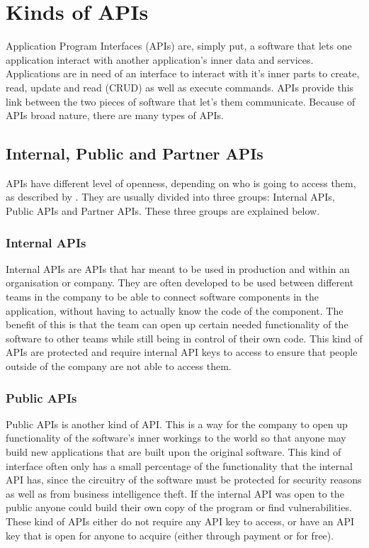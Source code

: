 \documentclass{cslthse-msc}
\begin{document}
    \section{Kinds of APIs}

    Application Program Interfaces (APIs) are, simply put, a software that
    lets one application interact with another application's inner data and
    services. Applications are in need of an interface to interact with it's
    inner parts to create, read, update and read (CRUD) as well as execute
    commands. APIs provide this link between the two pieces of software that let's
    them communicate. Because of APIs broad nature, there are many types of
    APIs\citep{rest2}.

    \subsection{Internal, Public and Partner APIs}
    APIs have different level of openness, depending on who is going to access them, as described by \cite{levin}. They are
    usually divided into three groups: Internal APIs, Public APIs and Partner APIs. These
    three groups are explained below.
    \subsubsection{Internal APIs}
    Internal APIs are APIs that har meant to be used in production and
    within an organisation or company. They are often developed to be used
    between different teams in the company to be able to connect software
    components in the application, without having to actually know the code
    of the component. The benefit of this is that the team can open up certain
    needed functionality of the software to other teams while still being in
    control of their own code. This kind of APIs are protected and require
    internal API keys to access to ensure that people outside of the company
    are not able to access them.
    \subsubsection{Public APIs}
    Public APIs is another kind of API. This is a way for the company to
    open up functionality of the software's inner workings to the world so
    that anyone may build new applications that are built upon the original
    software. This kind of interface often only has a small percentage of
    the functionality that the internal API has, since the circuitry of the
    software must be protected for security reasons as well as from business
    intelligence theft. If the internal API was open to the public anyone
    could build their own copy of the program or find vulnerabilities. These kind of APIs either do
    not require any API key to access, or have an API key that is open for
    anyone to acquire (either through payment or for free).
\end{document}
